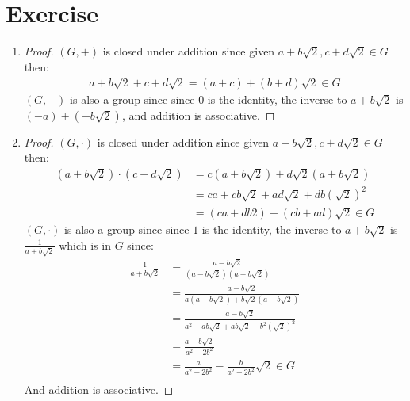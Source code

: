\documentclass{article}
\begin{document}
\section{Exercise}
\begin{enumerate}[label=(\alph*)]
    \item
    \begin{proof}
        $(G, +)$ is closed under addition since given $a + b\sqrt{2},
        c + d\sqrt{2} \in G$ then:
        \begin{align*}
            a + b\sqrt{2} + c + d\sqrt{2} = (a + c) + (b + d)\sqrt{2} \in G
        \end{align*}
        $(G, +)$ is also a group since since $0$ is the identity, the inverse to
        $a + b\sqrt{2}$ is $(-a) + (-b\sqrt{2})$, and addition is associative.
    \end{proof}
    \item
    \begin{proof}
        $(G, \cdot)$ is closed under addition since given $a + b\sqrt{2},
        c + d\sqrt{2} \in G$ then:
        \begin{align*}
            (a + b\sqrt{2}) \cdot (c + d\sqrt{2}) &= c(a + b\sqrt{2}) + d\sqrt{2}(a + b\sqrt{2}) \\
            &= ca + cb\sqrt{2} + ad\sqrt{2} + db(\sqrt{2})^2 \\
            &= (ca + db2) + (cb + ad)\sqrt{2} \in G
        \end{align*}
        $(G, \cdot)$ is also a group since since $1$ is the identity, the inverse to
        $a + b\sqrt{2}$ is $\frac{1}{a + b\sqrt{2}}$ which is in $G$ since:
        \begin{align*}
            \frac{1}{a + b\sqrt{2}} &= \frac{a - b\sqrt{2}}{(a - b\sqrt{2})(a + b\sqrt{2})} \\
            &= \frac{a - b\sqrt{2}}{a(a - b\sqrt{2}) + b\sqrt{2}(a - b\sqrt{2})} \\
            &= \frac{a - b\sqrt{2}}{a^2 - ab\sqrt{2} + ab\sqrt{2} - b^2(\sqrt{2})^2} \\
            &= \frac{a - b\sqrt{2}}{a^2 - 2b^2} \\
            &= \frac{a}{a^2 - 2b^2} - \frac{b}{a^2 - 2b^2}\sqrt{2} \in G \\
        \end{align*}
        And addition is associative.
        \end{proof}
\end{enumerate}
\end{document}
